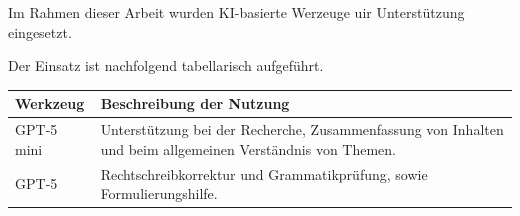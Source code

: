 
Im Rahmen dieser Arbeit wurden KI-basierte Werzeuge uir Unterstützung eingesetzt.

Der Einsatz ist nachfolgend tabellarisch aufgeführt.

\begin{tabularx}{1\textwidth} { 
  | >{\raggedright\arraybackslash}X 
  | >{\raggedright\arraybackslash}X | }
    \hline
    \textbf{Werkzeug} & \textbf{Beschreibung der Nutzung} \\
    \hline
    GPT-5 mini & Unterstützung bei der Recherche, Zusammenfassung von Inhalten und beim allgemeinen Verständnis von Themen. \\
    \hline
    GPT-5 & Rechtschreibkorrektur und Grammatikprüfung, sowie Formulierungshilfe. \\
    \hline
\end{tabularx}